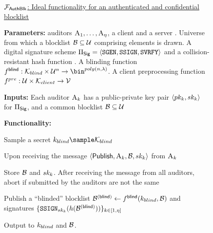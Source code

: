 \iffalse 
\begin{figure}
\begin{mdframed}
\footnotesize
\underline{$\mathcal{F}_{\mathsf{AuthBlk}}$: Ideal functionality for an authenticated and confidential blocklist}

\smallskip\noindent\textbf{Parameters:} \numAuditors auditors $\auditor[1], \dots, \auditor[\numAuditors]$, a client \client and a server \server. Universe \universe from which a blocklist $\blocklist \subseteq \universe$ comprising \blocklistSize elements is drawn. A digital signature scheme $\sigSchemeDefn$ and a collision-resistant hash function \hashFn. A blinding function $\blocklistBlindingAlg: \blocklistBlindingKeySpace \times \universe^{\blocklistSize} \rightarrow \bin^{\polyFn(\blocklistSize, \secParam)}$. A client preprocessing function $f^{pre}: \mathcal{U} \times \mathcal{K}_{client} \rightarrow \mathcal{V}$

\smallskip\noindent\textbf{Inputs:} Each auditor $\auditor[\auditorIdx]$ has a public-private key pair $\langle \auditorPubKeyGenericScheme[\auditorIdx], \auditorPrivKeyGenericScheme[\auditorIdx]  \rangle$ for $\Pi_{\mathsf{Sig}}$, and a common blocklist $\blocklist \subseteq \universe$


\smallskip\noindent\textbf{Functionality:} 

\itemListStart

\item Sample a secret $\blocklistBlindingKey \sample \blocklistBlindingKeySpace$

\item Upon receiving the message $\langle \publishList, \auditor[\auditorIdx], \blocklist, \auditorPrivKeyGenericScheme[\auditorIdx] \rangle$ from $\auditor[\auditorIdx]$
\enumListStart

\item Store $\blocklist$ and $\auditorPrivKeyGenericScheme[\auditorIdx]$. After receiving the \publishList message from all auditors, abort if \blocklist submitted by the auditors are not the same


\item Publish a ``blinded'' blocklist $\blindedBlocklist \assign \blocklistBlindingAlg(\blocklistBlindingKey, \blocklist)$ and signatures $\{ \signGenSig[\auditorPrivKeyGenericScheme[\auditorIdx]](\hashFn(\blindedBlocklist)) \}_{\auditorIdx \in [1, \numAuditors]}$

\item Output to \server $k_{blind}$ and $\blocklist$. 


\end{mdframed}
\end{figure}
